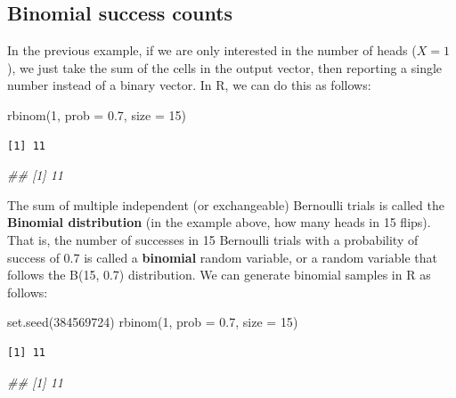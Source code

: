 \documentclass[
  letterpaper,
  DIV=11,
  numbers=noendperiod]{scrreprt}
\newenvironment{Shaded}{\begin{snugshade}}{\end{snugshade}}
\newcommand{\AttributeTok}[1]{\textcolor[rgb]{0.40,0.45,0.13}{#1}}
\newcommand{\DecValTok}[1]{\textcolor[rgb]{0.68,0.00,0.00}{#1}}
\newcommand{\DocumentationTok}[1]{\textcolor[rgb]{0.37,0.37,0.37}{\textit{#1}}}
\newcommand{\FloatTok}[1]{\textcolor[rgb]{0.68,0.00,0.00}{#1}}
\newcommand{\FunctionTok}[1]{\textcolor[rgb]{0.28,0.35,0.67}{#1}}
\newcommand{\NormalTok}[1]{\textcolor[rgb]{0.00,0.23,0.31}{#1}}
\begin{document}
\subsection{Binomial success counts}\label{binomial-success-counts}

In the previous example, if we are only interested in the number of
heads (\(X=1\)), we just take the sum of the cells in the output vector,
then reporting a single number instead of a binary vector. In R, we can
do this as follows:

\begin{Shaded}
\begin{Highlighting}[]
\FunctionTok{rbinom}\NormalTok{(}\DecValTok{1}\NormalTok{, }\AttributeTok{prob =} \FloatTok{0.7}\NormalTok{, }\AttributeTok{size =} \DecValTok{15}\NormalTok{)}
\end{Highlighting}
\end{Shaded}

\begin{verbatim}
[1] 11
\end{verbatim}

\begin{Shaded}
\begin{Highlighting}[]
\DocumentationTok{\#\# [1] 11}
\end{Highlighting}
\end{Shaded}

The sum of multiple independent (or exchangeable) Bernoulli trials is
called the \textbf{Binomial distribution} (in the example above, how
many heads in 15 flips). That is, the number of successes in 15
Bernoulli trials with a probability of success of 0.7 is called a
\textbf{binomial} random variable, or a random variable that follows the
B(15, 0.7) distribution. We can generate binomial samples in R as
follows:

\begin{Shaded}
\begin{Highlighting}[]
\FunctionTok{set.seed}\NormalTok{(}\DecValTok{384569724}\NormalTok{)}
\FunctionTok{rbinom}\NormalTok{(}\DecValTok{1}\NormalTok{, }\AttributeTok{prob =} \FloatTok{0.7}\NormalTok{, }\AttributeTok{size =} \DecValTok{15}\NormalTok{)}
\end{Highlighting}
\end{Shaded}

\begin{verbatim}
[1] 11
\end{verbatim}

\begin{Shaded}
\begin{Highlighting}[]
\DocumentationTok{\#\# [1] 11}
\end{Highlighting}
\end{Shaded}
\end{document}
